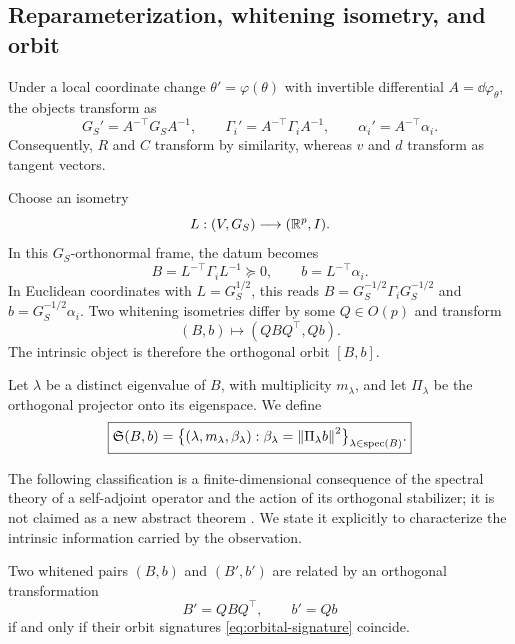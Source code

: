\subsection{Reparameterization, whitening isometry, and orbit}
Under a local coordinate change $\theta'=\varphi(\theta)$ with invertible differential $A=\dd\varphi_\theta$, the objects transform as
\begin{equation}
G_S'=A^{-\top}G_SA^{-1},
\qquad
\Gamma_i'=A^{-\top}\Gamma_iA^{-1},
\qquad
\alpha_i'=A^{-\top}\alpha_i.
\label{eq:covariance-laws}
\end{equation}
Consequently, $R$ and $C$ transform by similarity, whereas $v$ and $d$ transform as tangent vectors.

Choose an isometry
\[
L:(V,G_S)\longrightarrow(\mathbb{R}^p,I).
\]
In this $G_S$-orthonormal frame, the datum becomes
\begin{equation}
B=L^{-\top}\Gamma_iL^{-1}\succeq0,
\qquad
b=L^{-\top}\alpha_i.
\label{eq:whitened-pair}
\end{equation}
In Euclidean coordinates with $L=G_S^{1/2}$, this reads $B=G_S^{-1/2}\Gamma_iG_S^{-1/2}$ and $b=G_S^{-1/2}\alpha_i$. Two whitening isometries differ by some $Q\in O(p)$ and transform
\begin{equation}
(B,b)\longmapsto(QBQ^\top,Qb).
\end{equation}
The intrinsic object is therefore the orthogonal orbit $[B,b]$.

\begin{definition}
Let $\lambda$ be a distinct eigenvalue of $B$, with multiplicity $m_\lambda$, and let $\Pi_\lambda$ be the orthogonal projector onto its eigenspace. We define
\begin{equation}
\boxed{
\mathfrak S(B,b)
=
\bigl\{(\lambda,m_\lambda,\beta_\lambda):
\beta_\lambda=\left\lVert \Pi_\lambda b\right\rVert^2\bigr\}_{\lambda\in\operatorname{spec}(B)}.
}
\label{eq:orbital-signature}
\end{equation}
\end{definition}

The following classification is a finite-dimensional consequence of the spectral theory of a self-adjoint operator and the action of its orthogonal stabilizer; it is not claimed as a new abstract theorem \citep{halmos1951,weyl1946,sibirskii1967,sibirskii1968,khadzhiev1967}. We state it explicitly to characterize the intrinsic information carried by the observation.

\begin{theorem}
Two whitened pairs $(B,b)$ and $(B',b')$ are related by an orthogonal transformation
\[
B'=QBQ^\top,
\qquad
b'=Qb
\]
if and only if their orbit signatures \eqref{eq:orbital-signature} coincide.
\label{thm:orbit-classification}
\end{theorem}

